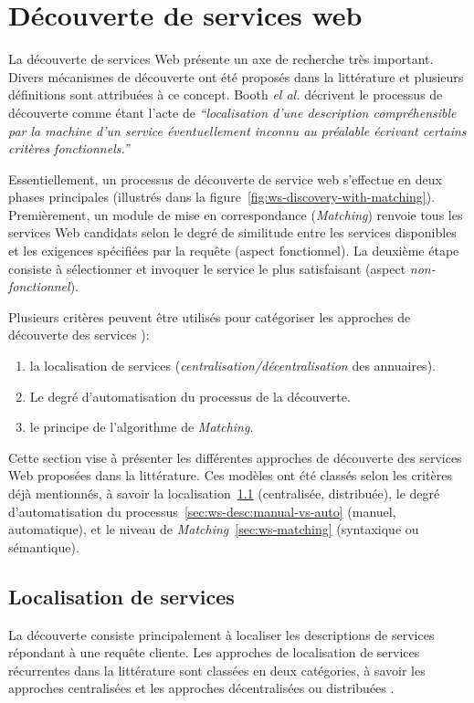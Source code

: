 \section{Découverte de services web}
\label{sec:ws-discovery}
La découverte de services Web présente un axe de recherche très
important. Divers mécanismes de découverte ont été proposés dans la
littérature et plusieurs définitions sont attribuées à ce
concept. Booth \textit{el al.} \cite{booth2004web} décrivent le
processus de découverte comme étant l'acte de \textit{``localisation
  d'une description compréhensible par la machine d'un service
  éventuellement inconnu au préalable écrivant certains critères
  fonctionnels.''}
\bigskip

\bigskip
Essentiellement, un processus de découverte de service web s'effectue
en deux phases principales (illustrés dans la
figure~\ref{fig:ws-discovery-with-matching}). Premièrement, un module
de mise en correspondance (\textit{Matching}) renvoie tous les
services Web candidats selon le degré de similitude entre les services
disponibles et les exigences spécifiées par la requête (aspect
fonctionnel). La deuxième étape consiste à sélectionner et invoquer le
service le plus satisfaisant (aspect \textit{non-fonctionnel}).

Plusieurs critères peuvent être utilisés pour catégoriser les
approches de découverte des services \cite{mohebbi2010comparative,
  elie2010, bitar2014cbr4wsd}):\newpage

  \begin{enumerate}
  \item la localisation de services
    (\textit{centralisation/décentralisation} des annuaires).
  \item Le degré d'automatisation du processus de la découverte.
  \item le principe de l'algorithme de \textit{Matching}.
  \end{enumerate}

  Cette section vise à présenter les différentes approches de
  découverte des services Web proposées dans la littérature. Ces
  modèles ont été classés selon les critères déjà mentionnés, à savoir
  la localisation~\ref{sec:ws-localisation} (centralisée, distribuée),
  le degré d'automatisation du
  processus~\ref{sec:ws-desc:manual-vs-auto} (manuel, automatique), et
  le niveau de \textit{Matching}~\ref{sec:ws-matching} (syntaxique ou
  sémantique).

\subsection{Localisation de services}
\label{sec:ws-localisation}
La découverte consiste principalement à localiser les descriptions de
services répondant à une requête cliente. Les approches de
localisation de services récurrentes dans la littérature sont classées
en deux catégories, à savoir les approches centralisées et les
approches décentralisées ou distribuées \cite{garofalakis2004web}.

